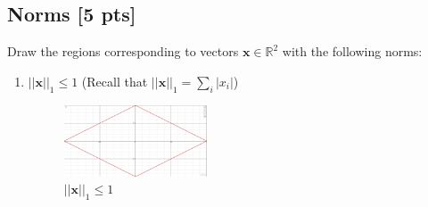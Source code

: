\documentclass[a4paper]{article}
\theoremstyle{definition}
\newcommand{\RR}{\mathbb{R}}
\newenvironment{soln}{
	\leavevmode\color{blue}\ignorespaces
}{}
\begin{document}
	\subsection{Norms [5 pts]}
	Draw the regions corresponding to vectors $\mathbf{x}\in\RR^2$ with the following norms:
	\begin{enumerate}
		\item 	$||\mathbf{x}||_1\leq 1$ (Recall that $||\mathbf{x}||_1 = \sum_i |x_i|$)

	\begin{soln}
	   \begin{figure}[h!]
	       \centering
	       \includegraphics[width=0.4\textwidth]{images/l1.png}  
	       \captionsetup{labelformat=empty}
	       \caption{$||\mathbf{x}||_1\leq 1$}
	       \label{fig:l1}
	   \end{figure}
	\end{soln}
		

\end{enumerate}
\end{document}
